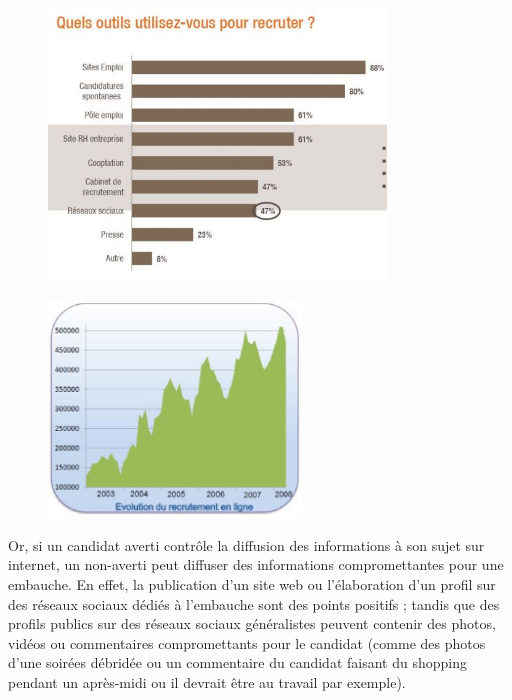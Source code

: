 \begin{figure}[H]
\center
\includegraphics[width=0.8\textwidth]{../resources/illustrations/recrutement-enquete}
\end{figure}
\begin{figure}[H]
\center
\includegraphics[width=0.6\textwidth]{../resources/illustrations/online_recrut}
\end{figure}

Or, si un candidat averti contrôle la diffusion des informations à son sujet sur internet, un non-averti peut diffuser des informations compromettantes pour une embauche. En effet, la publication d'un site web ou l'élaboration d'un profil sur des réseaux sociaux dédiés à l'embauche sont des points positifs ; tandis que des profils publics sur des réseaux sociaux généralistes peuvent contenir des photos, vidéos ou commentaires compromettants pour le candidat (comme des photos d'une soirées débridée ou un commentaire du candidat faisant du shopping pendant un après-midi ou il devrait être au travail par exemple).

